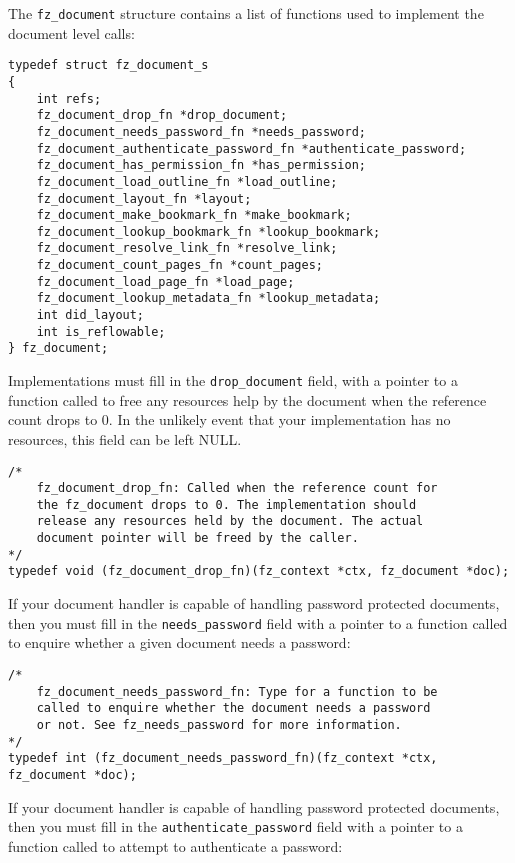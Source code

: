 \documentclass[oneside]{book}
\begin{document}
The \texttt{fz\_document} structure contains a list of functions used to implement the document level calls:

\begin{lstlisting}
typedef struct fz_document_s
{
	int refs;
	fz_document_drop_fn *drop_document;
	fz_document_needs_password_fn *needs_password;
	fz_document_authenticate_password_fn *authenticate_password;
	fz_document_has_permission_fn *has_permission;
	fz_document_load_outline_fn *load_outline;
	fz_document_layout_fn *layout;
	fz_document_make_bookmark_fn *make_bookmark;
	fz_document_lookup_bookmark_fn *lookup_bookmark;
	fz_document_resolve_link_fn *resolve_link;
	fz_document_count_pages_fn *count_pages;
	fz_document_load_page_fn *load_page;
	fz_document_lookup_metadata_fn *lookup_metadata;
	int did_layout;
	int is_reflowable;
} fz_document;
\end{lstlisting}

Implementations must fill in the \texttt{drop\_document} field, with a pointer to a function called to free any resources help by the document when the reference count drops to 0. In the unlikely event that your implementation has no resources, this field can be left NULL.

\begin{lstlisting}
/*
	fz_document_drop_fn: Called when the reference count for
	the fz_document drops to 0. The implementation should
	release any resources held by the document. The actual
	document pointer will be freed by the caller.
*/
typedef void (fz_document_drop_fn)(fz_context *ctx, fz_document *doc);
\end{lstlisting}

If your document handler is capable of handling password protected documents, then you must fill in the \texttt{needs\_password} field with a pointer to a function called to enquire whether a given document needs a password:

\begin{lstlisting}
/*
	fz_document_needs_password_fn: Type for a function to be
	called to enquire whether the document needs a password
	or not. See fz_needs_password for more information.
*/
typedef int (fz_document_needs_password_fn)(fz_context *ctx, fz_document *doc);
\end{lstlisting}

If your document handler is capable of handling password protected documents, then you must fill in the \texttt{authenticate\_password} field with a pointer to a function called to attempt to authenticate a password:
\end{document}
